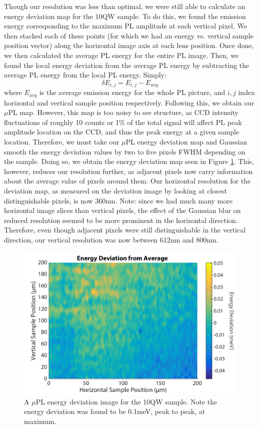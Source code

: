 \indent Though our resolution was less than optimal, we were still able to calculate an energy deviation map for the 10QW sample. To do this, we found the emission energy corresponding to the maximum PL amplitude at each vertical pixel. We then stacked each of these points (for which we had an energy vs. vertical sample position vector) along the horizontal image axis at each lens position. Once done, we then calculated the average PL energy for the entire PL image. Then, we found the local energy deviation from the average PL energy by subtracting the average PL energy from the local PL energy. Simply: 
\begin{equation}
\delta E_{i,j} = E_{i,j}-E_{avg}
\end{equation}
where $E_{avg}$ is the average emission energy for the whole PL picture, and $i,j$ index horizontal and vertical sample position respectively. Following this, we obtain our $\mu$PL map. However, this map is too noisy to see structure, as CCD intensity fluctuations of roughly 10 counts or 1\% of the total signal will affect PL peak amplitude location on the CCD, and thus the peak energy at a given sample location. Therefore, we must take our $\mu$PL energy deviation map and Gaussian smooth the energy deviation values by two to five pixels FWHM depending on the sample. Doing so, we obtain the energy deviation map seen in Figure \ref{devmap10QW}. This, however, reduces our resolution further, as adjacent pixels now carry information about the average value of pixels around them. Our horizontal resolution for the deviation map, as measured on the deviation image by looking at closest distinguishable pixels, is now 360nm. Note: since we had much many more horizontal image slices than vertical pixels, the effect of the Gaussian blur on reduced resolution seemed to be more prominent in the horizontal direction. Therefore, even though adjacent pixels were still distinguishable in the vertical direction, our vertical resolution was now between 612nm and 800nm. 

\begin{figure}[h!]
\centering
\includegraphics[width = .8\textwidth]{10QW_devplot.png}
\caption{ \doublespacing A $\mu$PL energy deviation image for the 10QW sample. Note the energy deviation was found to be 0.1meV, peak to peak, at maximum.}
\label{devmap10QW}
\end{figure}

